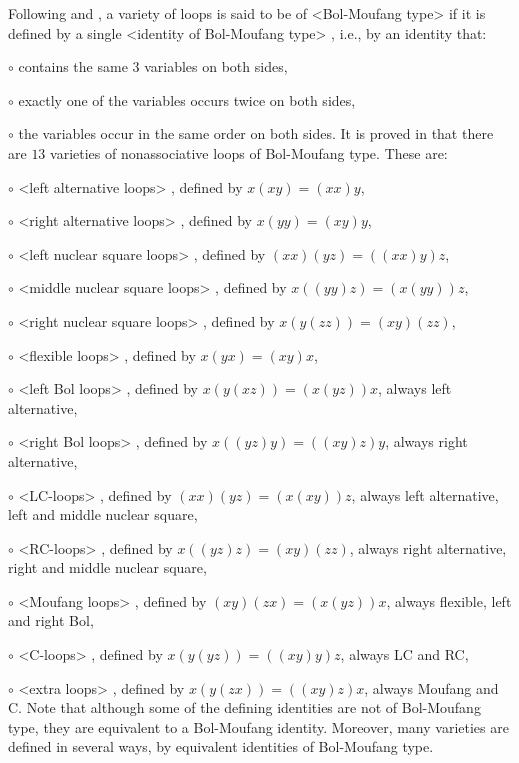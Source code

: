 Following \cite{Fe} and \cite{PV}, a variety of loops is said to be of
<Bol-Moufang type> if it is defined by a
single <identity of Bol-Moufang type>
%
%
, i.e., by an identity that:
\beginlist%
\item{$\circ$}
    contains the same $3$ variables on both sides,
\item{$\circ$}
     exactly one of the variables occurs twice on both sides,
\item{$\circ$}
     the variables occur in the same order on both sides.
\endlist
It is proved in \cite{PV} that there are $13$ varieties of nonassociative loops
of Bol-Moufang type. These are:
\beginlist%
\item{$\circ$}
    <left alternative loops>
%
%
, defined by $x(xy) = (xx)y$,
\item{$\circ$}
    <right alternative loops>
%
%
, defined by $x(yy) = (xy)y$,
\item{$\circ$}
    <left nuclear square loops>
%
%
, defined by $(xx)(yz) = ((xx)y)z$,
\item{$\circ$}
    <middle nuclear square loops>
%
%
, defined by $x((yy)z) = (x(yy))z$,
\item{$\circ$}
    <right nuclear square loops>
%
%
, defined by $x(y(zz)) = (xy)(zz)$,
\item{$\circ$}
    <flexible loops>
%
%
, defined by $x(yx) = (xy)x$,
\item{$\circ$}
    <left Bol loops>
%
%
, defined by $x(y(xz)) = (x(yz))x$,
    always left alternative,
\item{$\circ$}
    <right Bol loops>
%
%
, defined by $x((yz)y) = ((xy)z)y$,
    always right alternative,
\item{$\circ$}
    <LC-loops>
%
%
, defined by $(xx)(yz) = (x(xy))z$,
    always left alternative, left and middle nuclear square,
\item{$\circ$}
    <RC-loops>
%
%
, defined by $x((yz)z) = (xy)(zz)$,
    always right alternative, right and middle nuclear square,
\item{$\circ$}
    <Moufang loops>
%
%
, defined by $(xy)(zx) = (x(yz))x$,
    always flexible, left and right Bol,
\item{$\circ$}
    <C-loops>
%
%
, defined by $x(y(yz)) = ((xy)y)z$,
    always LC and RC,
\item{$\circ$}
    <extra loops>
%
%
, defined by $x(y(zx)) = ((xy)z)x$,
    always Moufang and C.
\endlist
Note that although some of the defining identities are not of Bol-Moufang type,
they are equivalent to a Bol-Moufang identity. Moreover, many varieties are
defined in several ways, by equivalent identities of Bol-Moufang type.

